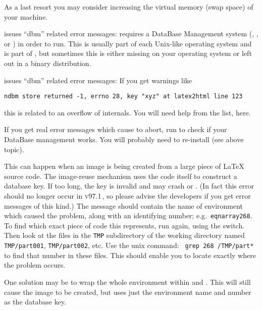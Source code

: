 \begin{htmllist}
As a last resort you may consider increasing the virtual memory
(swap space) of your machine.


\item [\fn{install-test} issues ``dbm'' related error messages: ]\latex{~\\}%
\latextohtml{} requires a DataBase Management system (,
, or ) in order to run.
This is usually part of each Unix-like operating system and
 is part of , but sometimes this is either missing
on your operating system or left out in a binary \Perl{} distribution.

\item [\fn{latex2html} issues ``dbm'' related error messages: ]
If you get warnings like
\begin{verbatim}
ndbm store returned -1, errno 28, key "xyz" at latex2html line 123
\end{verbatim}
this is related to an overflow of \latextohtml{} internals.
You will need help from the list, here.
\smallskip

If you get real error messages which cause \latextohtml{} to abort,
run  to check if your DataBase management works.
You will probably need to re-install  (see above topic).


This can happen when an image is being created from a large piece
of \LaTeX{} source code. The image-reuse mechanism uses the code itself
to construct a database key. If too long, the key is invalid and may
crash  or . (In fact this error should no longer
occur in \textsc{v97.1}\,, so please advise the \latextohtml{} developers if
you get error messages of this kind.)\html{\\}
The message should contain the name of environment which caused the problem,
along with an identifying number; e.g.\ \texttt{eqnarray268}.
To find which exact piece of code this represents, run \latextohtml{}
again, using the  switch. Then look at the files
in the \texttt{TMP} subdirectory of the working directory
named \texttt{TMP/part001}, \texttt{TMP/part002}, etc.
Use the unix  command: \texttt{ grep 268 }\texttt{/TMP/part* }
to find that number in these files. 
This should enable you to locate exactly where the problem occurs.

One solution may be to wrap the whole environment within
 and .
This will still cause the image to be created, 
but uses just the environment name and number as the database key.




\end{htmllist}
